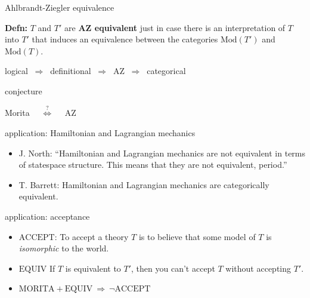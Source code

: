 \documentclass[17pt]{beamer}
\begin{document}
\begin{frame}{Ahlbrandt-Ziegler equivalence}

  \textbf{Defn:} $T$ and $T'$ are \textbf{AZ equivalent} just in case
  there is an interpretation of $T$ into $T'$ that induces an
  equivalence between the categories $\mathrm{Mod}(T')$ and
  $\mathrm{Mod}(T)$.


\end{frame}


\begin{frame}

\begin{center} {\small logical $\:\Longrightarrow\:$ definitional $\:\Longrightarrow\:$
AZ $\:\Longrightarrow\:$ categorical}  \end{center}

\end{frame}



\begin{frame}{conjecture}

  \begin{center} {\LARGE Morita
      $\quad\stackrel{?}{\Longleftrightarrow}\quad$ AZ} \end{center}


\end{frame}


\begin{frame}{application: Hamiltonian and Lagrangian mechanics}


\begin{itemize}
\item J. North: ``Hamiltonian and Lagrangian mechanics are not
  equivalent in terms of statespace structure.  This means that they
  are not equivalent, period.''
\item T. Barrett: Hamiltonian and Lagrangian mechanics are
  categorically equivalent.
\end{itemize}


\end{frame}


\begin{frame}{application: acceptance}


\begin{itemize}
\item $\mathrm{ACCEPT}$: To accept a theory $T$ is to believe that
  some model of $T$ is \emph{isomorphic} to the world.
\item $\mathrm{EQUIV}$ If $T$ is equivalent to $T'$, then you can't
  accept $T$ without accepting $T'$.
\item $\mathrm{MORITA} + \mathrm{EQUIV} \:\Longrightarrow \: \neg \mathrm{ACCEPT}$
\end{itemize}


\end{frame}
\end{document}
